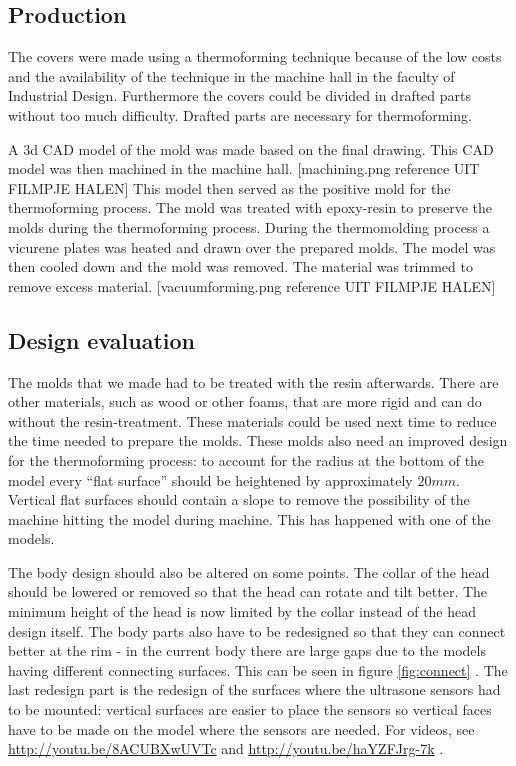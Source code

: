 \documentclass[technical_document.tex]{subfiles}
\begin{document}
\subsection*{Production} 
The covers were made using a thermoforming technique because of the low costs and the availability of the technique in the machine hall in the faculty of Industrial Design. Furthermore the covers could be divided in drafted parts without too much difficulty. Drafted parts are necessary for thermoforming.

A 3d CAD model of the mold was made based on the final drawing. This CAD model was then machined in the machine hall. [machining.png reference UIT FILMPJE HALEN] This model then served as the positive mold for the thermoforming process. The mold was treated with epoxy-resin to preserve the molds during the thermoforming process. 
During the thermomolding process a vicurene plates was heated and drawn over the prepared molds. The model was then cooled down and the mold was removed. The material was trimmed to remove excess material. [vacuumforming.png reference UIT FILMPJE HALEN]

\subsection*{Design evaluation}
The molds that we made had to be treated with the resin afterwards. There are other materials, such as wood or other foams, 
that are more rigid and can do without the resin-treatment. These materials could be used next time to reduce the time 
needed to prepare the molds. These molds also need an improved design for the thermoforming process: to account for the 
radius at the bottom of the model every ``flat surface'' should be heightened by approximately $20 mm$. Vertical flat surfaces should contain a slope to remove the possibility of the machine hitting the model during machine. This has happened with one of the models.

The body design should also be altered on some points. The collar of the head should be lowered or removed so that the head can rotate and tilt better. The minimum height of the head is now limited by the collar instead of the head design itself. The body parts also have to be redesigned so that they can connect better at the rim - in the current body there are large gaps due to the models having different connecting surfaces. This can be seen in figure \ref{fig:connect} . The last redesign part is the redesign of the surfaces where the ultrasone sensors had to be mounted: vertical surfaces are easier to place the sensors so vertical faces have to be made on the model where the sensors are needed. For videos, see  \url{http://youtu.be/8ACUBXwUVTc} and \url{http://youtu.be/haYZFJrg-7k} .
\end{document}
